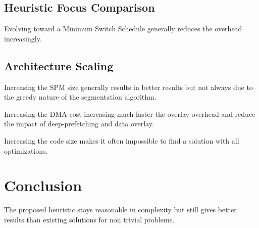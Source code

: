 \documentclass{article}
\begin{document}
\subsection{Heuristic Focus Comparison}
Evolving toward a Minimum Switch Schedule generally reduces the overhead increasingly.

\subsection{Architecture Scaling}
Increasing the SPM size generally results in better results but not always due to the greedy nature of the segmentation algorithm.

Increasing the DMA cost increasing much faster the overlay overhead and reduce the impact of deep-prefetching and data overlay.

Increasing the code size makes it often impossible to find a solution with all optimizations.


\section{Conclusion}
\label{critic}
The proposed heuristic stays reasonable in complexity but still gives better results than existing solutions for non trivial problems.




\end{document}

